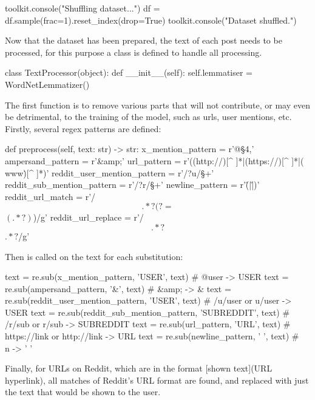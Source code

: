         \begin{python}
toolkit.console("Shuffling dataset...")
df = df.sample(frac=1).reset_index(drop=True)
toolkit.console("Dataset shuffled.")
        \end{python}

        Now that the dataset has been prepared, the text of each post needs to be processed, for this purpose a class  is defined to handle all processing.

        \begin{python}
class TextProcessor(object):
    def __init__(self):
        self.lemmatiser = WordNetLemmatizer()
        \end{python}
        
        The first function  is to remove various parts that will not contribute, or may even be detrimental, to the training of the model, such as urls, user mentions, etc. Firstly, several regex patterns are defined:

        \begin{python}
def preprocess(self, text: str) -> str:
    x_mention_pattern = r'@\S{4,}'
    ampersand_pattern = r'&amp;'
    url_pattern = r'((http://)[^ ]*|(https://)[^ ]*|( www\.)[^ ]*)'
    reddit_user_mention_pattern = r'/?u/\S+'
    reddit_sub_mention_pattern = r'/?r/\S+'
    newline_pattern = r'(\r\n|\r|\n)'
    reddit_url_match = r'/\[.*?(?=\]\((.*?)\))/g'
    reddit_url_replace = r'/\[.*?\]\(.*?\)/g'
        \end{python}

        Then  is called on the text for each substitution:

        \begin{python}
text = re.sub(x_mention_pattern, 'USER', text) # @user -> USER
text = re.sub(ampersand_pattern, '&', text) # &amp; -> &
text = re.sub(reddit_user_mention_pattern, 'USER', text) # /u/user or u/user -> USER
text = re.sub(reddit_sub_mention_pattern, 'SUBREDDIT', text) # /r/sub or r/sub -> SUBREDDIT
text = re.sub(url_pattern, 'URL', text) # https://link or http://link -> URL
text = re.sub(newline_pattern, ' ', text) # \\n -> ' '
        \end{python}

        Finally, for URLs on Reddit, which are in the format [shown text](URL hyperlink), all matches of Reddit's URL format are found, and replaced with just the text that would be shown to the user.

